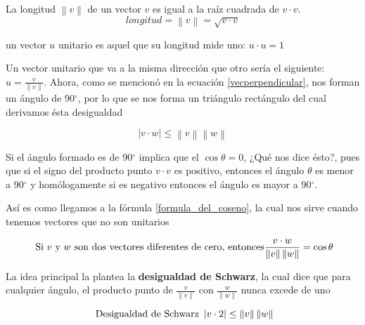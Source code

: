 \begin{definition}
	La longitud $\left\lVert  v \right\rVert$ de un vector $v$ es igual a la raíz cuadrada de $v \cdot v$.
	\begin{equation}
		longitud= \left\lVert v \right\rVert = \sqrt{v \cdot v}
	\end{equation}
\end{definition}

\begin{definition}
	un vector $u$ unitario es aquel que su longitud mide uno: $u\cdot u=1$
\end{definition}

Un vector unitario que va a la misma dirección que otro sería el siguiente: $u= \frac{v}{\left\lVert v\right\rVert }$. Ahora, como se mencionó en la
ecuación \ref{vecperpendicular}, nos forman un ángulo de 90$^{\circ}$, por lo que se nos forma un triángulo rectángulo
del cual derivamos ésta desigualdad

\begin{equation}
	\left | v \cdot w \right | \leqslant \left \| v \right \| \left \| w \right \|
\end{equation}

Si el ángulo formado es de 90$^{\circ}$ implica que el $\cos \theta=0$, ¿Qué nos dice ésto?, pues que si
el signo del producto punto $v \cdot v$ es positivo, entonces el ángulo $\theta$ es menor a 90$^{\circ}$ y homólogamente si es negativo
entonces el ángulo es mayor a 90$^{\circ}$.

Así es como llegamos a la fórmula \ref{formula_del_coseno}, la cual nos sirve cuando tenemos vectores que no son unitarios

\begin{equation}
	\textup{ Si $v$ y $w$ son dos vectores diferentes de cero, entonces} \frac{v\cdot w}{\left \| v \right \| \left \| w \right \|} = \cos \theta
	\label{formula_del_coseno}
\end{equation}

La idea principal la plantea la \textbf{desigualdad de Schwarz}, la cual dice que para cualquier ángulo,
el producto punto de $\frac{v}{\left\lVert v\right\rVert }$ con $\frac{w}{\left\lVert w\right\rVert }$
nunca excede de uno

\begin{equation}
	\textup{ Desigualdad de Schwarz } \left\lvert v \cdot 2\right\rvert  \leq \left\lVert v\right\rVert  \left\lVert w \right\rVert
\end{equation}

